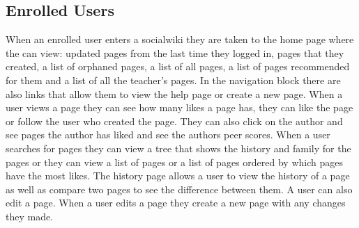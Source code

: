 \documentclass[letterpaper,twoside,11pt]{article}
\begin{document}
	\subsection{Enrolled Users}
	When an enrolled user enters a socialwiki they are taken to the home page where the can view: updated pages from the last time they logged in, pages that they created, a list of orphaned pages, a list of all pages, a list of pages recommended for them and a list of all the teacher's pages. In the navigation block there are also links that allow them to view the help page or create a new page.
	When a user views a page they can see how many likes a page has, they can like the page or follow the user who created the page. They can also click on the author and see pages the author has liked and see the authors peer scores.
	When a user searches for pages they can view a tree that shows the history and family for the pages or they can view a list of pages or a list of pages ordered by which pages have the most likes.
	The history page allows a user to view the history of a page as well as compare two pages to see the difference between them.
	A user can also edit a page. When a user edits a page they create a new page with any changes they made.
	
\end{document}
